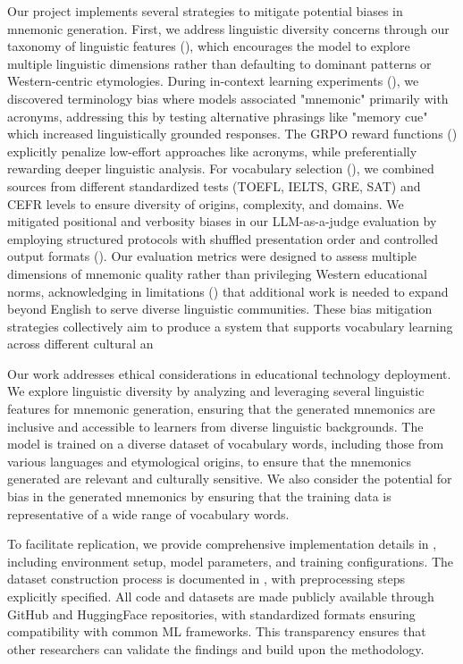  Our project implements several strategies to mitigate potential biases in mnemonic generation. First, we address linguistic diversity concerns through our taxonomy of linguistic features (), which encourages the model to explore multiple linguistic dimensions rather than defaulting to dominant patterns or Western-centric etymologies. During in-context learning experiments (), we discovered terminology bias where models associated "mnemonic" primarily with acronyms, addressing this by testing alternative phrasings like "memory cue" which increased linguistically grounded responses. The GRPO reward functions () explicitly penalize low-effort approaches like acronyms, while preferentially rewarding deeper linguistic analysis. For vocabulary selection (), we combined sources from different standardized tests (TOEFL, IELTS, GRE, SAT) and CEFR levels to ensure diversity of origins, complexity, and domains. We mitigated positional and verbosity biases in our LLM-as-a-judge evaluation by employing structured protocols with shuffled presentation order and controlled output formats (). Our evaluation metrics were designed to assess multiple dimensions of mnemonic quality rather than privileging Western educational norms, acknowledging in limitations () that additional work is needed to expand beyond English to serve diverse linguistic communities. These bias mitigation strategies collectively aim to produce a system that supports vocabulary learning across different cultural an

 Our work addresses ethical considerations in educational technology deployment. We explore linguistic diversity by analyzing and leveraging several linguistic features for mnemonic generation, ensuring that the generated mnemonics are inclusive and accessible to learners from diverse linguistic backgrounds. The model is trained on a diverse dataset of vocabulary words, including those from various languages and etymological origins, to ensure that the mnemonics generated are relevant and culturally sensitive. We also consider the potential for bias in the generated mnemonics by ensuring that the training data is representative of a wide range of vocabulary words.

 To facilitate replication, we provide comprehensive implementation details in , including environment setup, model parameters, and training configurations. The dataset construction process is documented in , with preprocessing steps explicitly specified. All code and datasets are made publicly available through GitHub and HuggingFace repositories, with standardized formats ensuring compatibility with common ML frameworks. This transparency ensures that other researchers can validate the findings and build upon the methodology.
